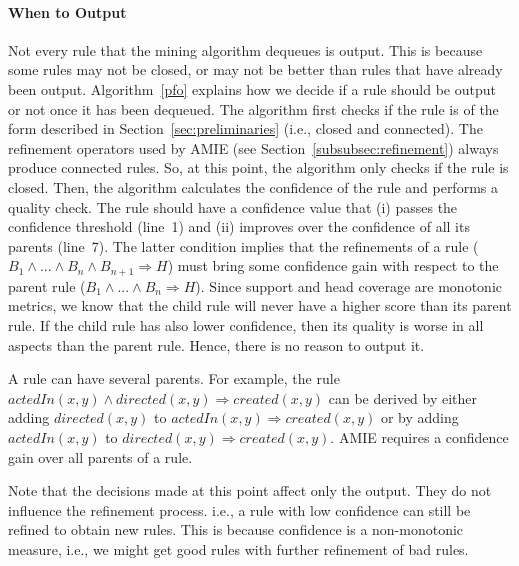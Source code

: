 \paragraph{When to Output}\label{subsubsec:whenToOutput}
Not every rule that the mining algorithm dequeues is output. This is because some rules may not be closed, or may not be better than rules that have already been output. Algorithm~\ref{pfo} explains how we decide if a rule should be output or not once it has been dequeued.
The algorithm first checks if the rule is of the form described in Section~\ref{sec:preliminaries} (i.e., closed and connected).
The refinement operators used by AMIE (see Section~\ref{subsubsec:refinement}) always produce connected rules.
So, at this point, the algorithm only checks if the rule is closed. Then, the algorithm calculates
the confidence of the rule and performs a quality check. The rule should have a confidence value that (i) passes the confidence threshold (line~1)
and (ii) improves over the confidence of all its parents (line~7).
The latter condition implies that the refinements of a rule ($B_1 \wedge ... \wedge B_n \wedge B_{n+1} \Rightarrow H$) must
bring some confidence gain with respect to the parent rule
($B_1 \wedge ... \wedge B_n \Rightarrow H$). Since support and head coverage are monotonic metrics,
we know that the child rule will never have a higher score than its parent rule.
If the child rule has also lower confidence, then its quality is worse in all aspects than the parent rule. Hence, there is no reason to output it.

A rule can have several parents. For example, the rule $actedIn(x,y) \wedge directed(x,y) \Rightarrow created(x,y)$
can be derived by either adding $directed(x,y)$ to  $actedIn(x,y) \Rightarrow created(x,y)$ or by adding $actedIn(x,y)$ to
$directed(x,y) \Rightarrow created(x,y)$. AMIE requires a confidence gain over all parents of a rule.

Note that the decisions made at this point affect only the output. They do not influence the refinement process. i.e., a rule with low confidence can still be refined to obtain new rules.
This is because confidence is a non-monotonic measure, i.e., we might get good rules with further refinement of bad rules.


